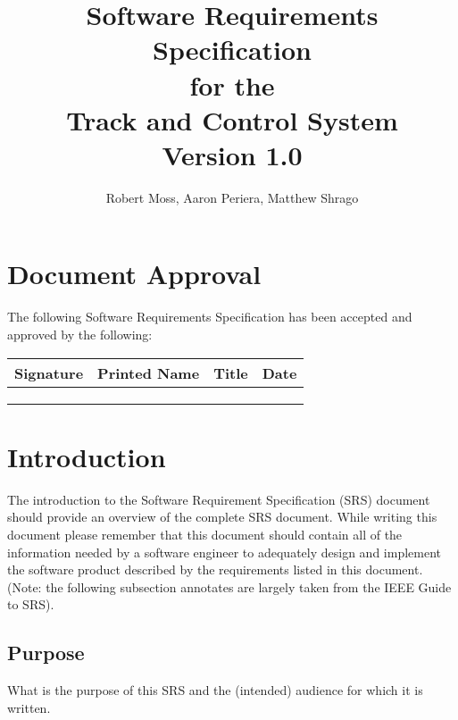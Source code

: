 \documentclass[titlepage]{article}
\begin{document}
\title{
\textbf{
Software Requirements Specification}
\protect\\
for the
\protect\\
\textbf{
Track and Control System}
\protect\\
{\small Version 1.0}}

\author{Robert Moss, Aaron Periera, Matthew Shrago}
\maketitle

\section*{Document Approval}

The following Software Requirements Specification has been accepted and approved by the following:

\begin{center}
    \begin{tabularx}{\textwidth}{ |X|X|X|X| }
    \hline
    \textbf{Signature} & \textbf{Printed Name} & \textbf{Title} & \textbf{Date} \\ \hline
     &  &  &  \\ \hline
     &  &  &  \\ \hline
     &  &  &  \\ \hline
    \end{tabularx}
\end{center}

\newpage
\tableofcontents{} 
\newpage

\section{Introduction}
The introduction to the Software Requirement Specification (SRS) document should provide an overview of the complete SRS document.  While writing this document please remember that this document should contain all of the information needed by a software engineer to adequately design and implement the software product described by the requirements listed in this document.   (Note: the following subsection annotates are largely taken  from the IEEE Guide to SRS).

\subsection{Purpose}
What is the purpose of this SRS and the (intended) audience for which it is written.
\end{document}
